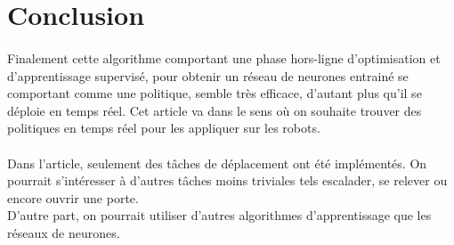 \documentclass[a4paper,10pt]{article}
\begin{document}
\section{Conclusion}
\paragraph{}
Finalement cette algorithme comportant une phase hors-ligne d'optimisation et d'apprentissage supervisé, pour obtenir un réseau de neurones entrainé se comportant comme une politique,  semble très efficace, d'autant plus qu'il se déploie en temps réel. 
Cet article va dans le sens où on souhaite trouver des politiques en temps réel pour les appliquer sur les robots. 
\paragraph{}
Dans l'article, seulement des tâches de déplacement ont été implémentés. On pourrait s'intéresser à d'autres tâches moins triviales tels escalader, se relever ou encore ouvrir une porte.\\
D'autre part, on pourrait utiliser d'autres algorithmes d'apprentissage que les réseaux de neurones. 




\end{document}
